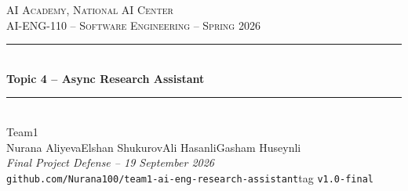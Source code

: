 \documentclass[aspectratio=169,11pt]{beamer}
\newcommand{\teamname}{Team1}
\newcommand{\topicchoice}{Topic 4 -- Async Research Assistant}
\newcommand{\memberone}{Nurana Aliyeva}
\newcommand{\membertwo}{Elshan Shukurov}
\newcommand{\memberthree}{Ali Hasanli}
\newcommand{\memberfour}{Gasham Huseynli}
\newcommand{\repolink}{github.com/Nurana100/team1-ai-eng-research-assistant}
\newcommand{\defensedate}{19 September 2026}
\newcommand{\coursecode}{AI-ENG-110}
\newcommand{\coursename}{Software Engineering}
\newcommand{\institution}{AI Academy, National AI Center}
\newcommand{\semester}{Spring 2026}
\begin{document}
{%
\begin{frame}[plain]
  \begin{center}
    \vspace{0.5cm}
    {\small \textsc{\institution}}\\[0.2em]
    {\small \textsc{\coursecode{} -- \coursename{} -- \semester{}}}\\[1.0em]
    \rule{0.7\textwidth}{0.6pt}\\[0.4em]
    {\LARGE\bfseries\color{accent} \topicchoice}\\[0.4em]
    \rule{0.7\textwidth}{0.6pt}\\[1.0em]
    {\large \teamname}\\[0.5em]
    {\normalsize \memberone\quad\textbullet\quad\membertwo\quad\textbullet\quad\memberthree\quad\textbullet\quad\memberfour}\\[0.8cm]
    {\footnotesize\itshape Final Project Defense -- \defensedate}\\[0.4em]
    {\footnotesize\texttt{\repolink}\quad\textbullet\quad tag \texttt{v1.0-final}}
  \end{center}
\end{frame}
}
\end{document}

